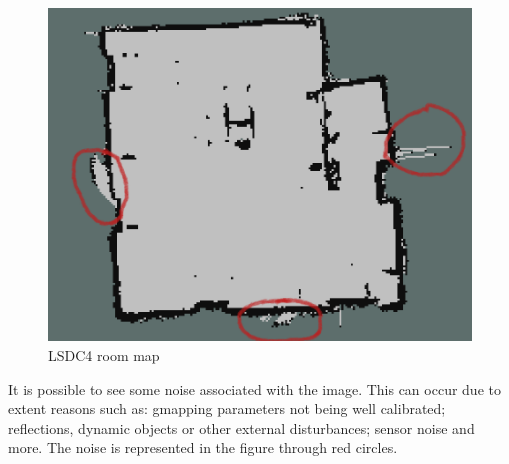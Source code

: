 \begin{figure}[h]
\centering
\vspace{3pt}
\includegraphics[scale=0.4]{./Images/lsdc4Map}
\caption{LSDC4 room map}
\label{fig:flowchart}
\end{figure}

It is possible to see some noise associated with the image. This can occur due to extent reasons such as: gmapping parameters not being well calibrated; reflections, dynamic objects or other external disturbances; sensor noise and more. The noise is represented in the figure through red circles.
